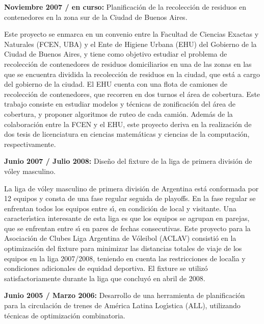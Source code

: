 
\item \textbf{Noviembre 2007 / en curso:} Planificaci\'on de la
recolecci\'on de residuos en contenedores en la zona sur de la
Ciudad de Buenos Aires.

Este proyecto se enmarca en un convenio entre la Facultad de
Ciencias Exactas y Naturales (FCEN, UBA) y el Ente de Higiene
Urbana (EHU) del Gobierno de la Ciudad de Buenos Aires, y tiene
como objetivo estudiar el problema de recolecci\'on de
contenedores de residuos domiciliarios en una de las zonas en las
que se encuentra dividida la recolecci\'on de residuos en la
ciudad, que est\'a a cargo del gobierno de la ciudad. El EHU
cuenta con una flota de camiones de recolecci\'on de contenedores,
que recorren en dos turnos el \'area de cobertura. Este trabajo
consiste en estudiar modelos y t\'ecnicas de zonificaci\'on del
\'area de cobertura, y proponer algoritmos de ruteo de cada
cami\'on. Adem\'as de la colaboraci\'on entre la FCEN y el EHU,
este proyecto deriva en la realizaci\'on de dos tesis de
licenciatura en ciencias matem\'aticas y ciencias de la
computaci\'on, respectivamente.

\item \textbf{Junio 2007 / Julio 2008:} Dise\~no del fixture de la
liga de primera divisi\'on de v\'oley masculino.

La liga de v\'oley masculino de primera divisi\'on de Argentina
est\'a conformada por 12 equipos y consta de una fase regular
seguida de playoffs. En la fase regular se enfrentan todos los
equipos entre s\'{\i}, en condici\'on de local y visitante. Una
caracter\'{\i}stica interesante de esta liga es que los equipos se
agrupan en parejas, que se enfrentan entre s\'{\i} en pares de
fechas consecutivas. Este proyecto para la Asociaci\'on de Clubes
Liga Argentina de V\'oleibol (ACLAV) consisti\'o en la
optimizaci\'on del fixture para minimizar las distancias totales
de viaje de los equipos en la liga 2007/2008, teniendo en cuenta
las restricciones de local\'{\i}a y condiciones adicionales de
equidad deportiva. El fixture se utiliz\'o satisfactoriamente
durante la liga que concluy\'o en abril de 2008.


\item \textbf{Junio 2005 / Marzo 2006:} Desarrollo de una
herramienta de planificaci\'on para la circulaci\'on de trenes de
Am\'erica Latina Log\'{\i}stica (ALL), utilizando t\'ecnicas de
optimizaci\'on combinatoria.

